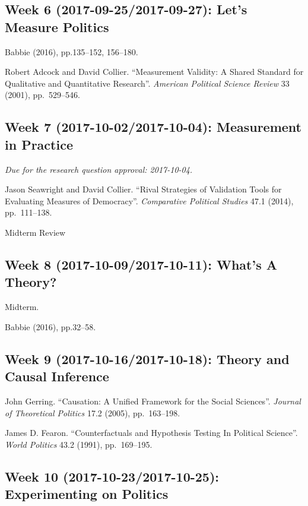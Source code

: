 \documentclass[11pt,]{article}
\theoremstyle{definition}
\theoremstyle{definition}
\theoremstyle{remark}
\begin{document}
\subsection{Week 6 (2017-09-25/2017-09-27): Let's Measure
Politics}\label{week-6-2017-09-252017-09-27-lets-measure-politics}

Babbie (2016), pp.135--152, 156--180.

Robert Adcock and David Collier. ``Measurement Validity: A Shared
Standard for Qualitative and Quantitative Research''.
\emph{American Political Science Review} 33 (2001), pp.~529--546.

\subsection{Week 7 (2017-10-02/2017-10-04): Measurement in
Practice}\label{week-7-2017-10-022017-10-04-measurement-in-practice}

\emph{Due for the research question approval: 2017-10-04.}

Jason Seawright and David Collier. ``Rival Strategies of Validation
Tools for Evaluating Measures of Democracy''.
\emph{Comparative Political Studies} 47.1 (2014), pp.~111--138.

Midterm Review

\subsection{Week 8 (2017-10-09/2017-10-11): What's A
Theory?}\label{week-8-2017-10-092017-10-11-whats-a-theory}

Midterm.

Babbie (2016), pp.32--58.

\subsection{Week 9 (2017-10-16/2017-10-18): Theory and Causal
Inference}\label{week-9-2017-10-162017-10-18-theory-and-causal-inference}

John Gerring. ``Causation: A Unified Framework for the Social
Sciences''. \emph{Journal of Theoretical Politics} 17.2 (2005),
pp.~163--198.

James D. Fearon. ``Counterfactuals and Hypothesis Testing In Political
Science''. \emph{World Politics} 43.2 (1991), pp.~169--195.

\subsection{Week 10 (2017-10-23/2017-10-25): Experimenting on
Politics}\label{week-10-2017-10-232017-10-25-experimenting-on-politics}
\end{document}
